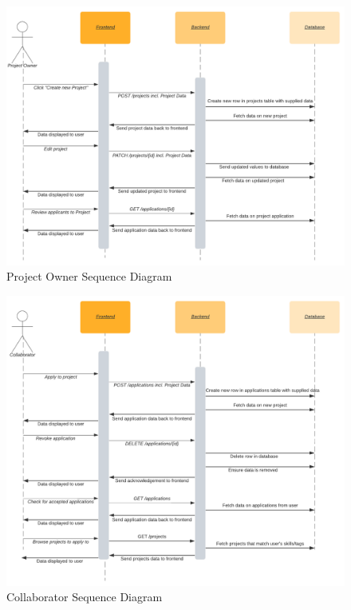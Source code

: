 \documentclass[a4paper,11pt]{report}
\begin{document}
\begin{figure}[H]
    \centering
    \includegraphics[width=\textwidth]{sd-projectowner.png}
    \caption{Project Owner Sequence Diagram}
    \label{fig:projectowner-sd}
\end{figure}

\begin{figure}[H]
    \centering
    \includegraphics[width=\textwidth,keepaspectratio]{sd-collaborator.png}
    \caption{Collaborator Sequence Diagram}
    \label{fig:collaborator-sd}
\end{figure}
\end{document}
